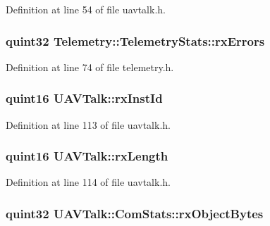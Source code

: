 \-Definition at line 54 of file uavtalk.\-h.

\hypertarget{group___u_a_v_talk_plugin_gaf07e5e11a7f3b4c277a26fa5dba7d3fa}{
\subsubsection[{rx\-Errors}]{\setlength{\rightskip}{0pt plus 5cm}quint32 {\bf \-Telemetry\-::\-Telemetry\-Stats\-::rx\-Errors}}}\label{group___u_a_v_talk_plugin_gaf07e5e11a7f3b4c277a26fa5dba7d3fa}


\-Definition at line 74 of file telemetry.\-h.

\hypertarget{group___u_a_v_talk_plugin_ga72761110b9b683dad5615619c9323674}{
\subsubsection[{rx\-Inst\-Id}]{\setlength{\rightskip}{0pt plus 5cm}quint16 {\bf \-U\-A\-V\-Talk\-::rx\-Inst\-Id}}}\label{group___u_a_v_talk_plugin_ga72761110b9b683dad5615619c9323674}


\-Definition at line 113 of file uavtalk.\-h.

\hypertarget{group___u_a_v_talk_plugin_ga52cc4d0f063a520fcf7fc2a10254118b}{
\subsubsection[{rx\-Length}]{\setlength{\rightskip}{0pt plus 5cm}quint16 {\bf \-U\-A\-V\-Talk\-::rx\-Length}}}\label{group___u_a_v_talk_plugin_ga52cc4d0f063a520fcf7fc2a10254118b}


\-Definition at line 114 of file uavtalk.\-h.

\hypertarget{group___u_a_v_talk_plugin_ga6a61f515e2c09de8fadddb1d8382a2a1}{
\subsubsection[{rx\-Object\-Bytes}]{\setlength{\rightskip}{0pt plus 5cm}quint32 {\bf \-U\-A\-V\-Talk\-::\-Com\-Stats\-::rx\-Object\-Bytes}}}\label{group___u_a_v_talk_plugin_ga6a61f515e2c09de8fadddb1d8382a2a1}


